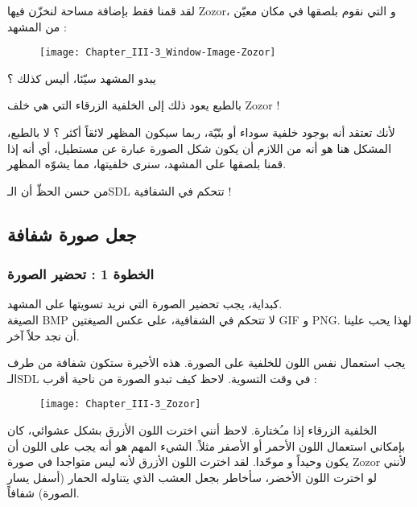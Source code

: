 لقد قمنا فقط بإضافة مساحة لنخزّن فيها 
\textenglish{Zozor}،
و التي نقوم بلصقها في مكان معيّن من المشهد :

\begin{figure}[H]
	\centering
	\texttt{[image: Chapter\_III-3\_Window-Image-Zozor]}
\end{figure}

يبدو المشهد سيّئا، أليس كذلك ؟

\begin{question}
بالطبع يعود ذلك إلى الخلفية الزرقاء التي هي خلف 
\textenglish{Zozor} !
\end{question}

لأنك تعتقد أنه بوجود خلفية سوداء أو بنّيّة، ربما سيكون المظهر لائقاً أكثر ؟ لا بالطبع، المشكل هنا هو أنه من اللازم أن يكون شكل الصورة عبارة عن مستطيل، أي أنه إذا قمنا بلصقها على المشهد، سنرى خلفيتها، مما يشوّه المظهر.

من حسن الحظّ أن الـ\textenglish{SDL}
تتحكم في الشفافية !

\subsection{جعل صورة شفافة}

\subsubsection{الخطوة 1 : تحضير الصورة}

كبداية، يجب تحضير الصورة التي نريد تسويتها على المشهد.\\
الصيغة 
\textenglish{BMP}
لا تتحكم في الشفافية، على عكس الصيغتين 
\textenglish{GIF}
و 
\textenglish{PNG}.
لهذا يحب علينا أن نجد حلاً آخر. 

يجب استعمال نفس اللون للخلفية على الصورة. هذه الأخيرة ستكون شفافة من طرف الـ\textenglish{SDL}
في وقت التسوية. لاحظ كيف تبدو الصورة
من ناحية أقرب :

\begin{figure}[H]
	\centering
	\texttt{[image: Chapter\_III-3\_Zozor]}
\end{figure}


الخلفية الزرقاء إذا مـُختارة. لاحظ أنني اخترت اللون الأزرق بشكل عشوائي، كان بإمكاني استعمال اللون الأحمر أو الأصفر مثلاً. الشيء المهم هو أنه يجب على اللون أن يكون وحيداً و موحّدا. لقد اخترت اللون الأزرق لأنه ليس متواجدا في صورة 
\textenglish{Zozor}
لأنني لو اخترت اللون الأخضر، سأخاطر بجعل العشب الذي يتناوله الحمار (أسفل يسار الصورة) شفافاً. 

